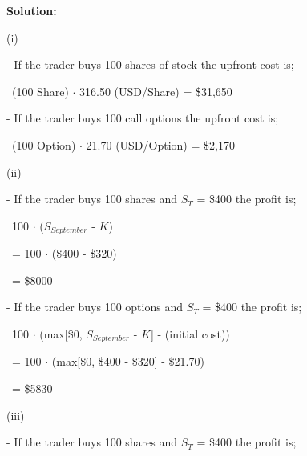 \documentclass{article}
\begin{document}
\textbf{Solution:} 

(i) 

- If the trader buys 100 shares of stock the upfront cost is;  

\vspace{\baselineskip}

\, (100 Share) $\cdot$ 316.50 (USD/Share) = \$31,650

\vspace{\baselineskip}

- If the trader buys 100 call options the upfront cost is;  

\vspace{\baselineskip}

\, (100 Option) $\cdot$ 21.70 (USD/Option) = \$2,170

\vspace{\baselineskip}

(ii)

- If the trader buys 100 shares and $S_T$ = \$400 the profit is;

\vspace{\baselineskip}

\, 100 $\cdot$ ($S_{September}$ - $K$) 

\vspace{\baselineskip}

\, = 100 $\cdot$ (\$400 - \$320)

\vspace{\baselineskip}

\, = \$8000

\vspace{\baselineskip}

- If the trader buys 100 options and $S_T$ = \$400 the profit is;

\vspace{\baselineskip}

\, 100 $\cdot$ (max[\$0, $S_{September}$ - $K$]  - (initial cost))

\vspace{\baselineskip}

\, = 100  $\cdot$ (max[\$0, \$400 - \$320]  - \$21.70)

\vspace{\baselineskip}

\, = \$5830

\vspace{\baselineskip}

(iii)

- If the trader buys 100 shares and $S_T$ = \$400 the profit is;
\end{document}
